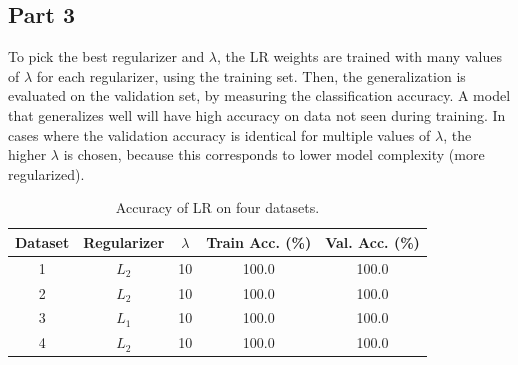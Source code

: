 \subsection{Part 3}
To pick the best regularizer and $\lambda$, the LR weights are trained with many values of $\lambda$ for each regularizer, using the training set.
Then, the generalization is evaluated on the validation set, by measuring the classification accuracy.
A model that generalizes well will have high accuracy on data not seen during training.
In cases where the validation accuracy is identical for multiple values of $\lambda$, the higher $\lambda$ is chosen, because this corresponds to lower model complexity (more regularized).

\begin{table}[ht!]
\centering
\begin{tabular}{||c c c c c||}  
 \hline
 Dataset & Regularizer & $\lambda$ & Train Acc. (\%) & Val. Acc. (\%) \\ [0.3ex] 
 \hline\hline
 1 & $L_2$ & 10 & 100.0 & 100.0 \\ 
 \hline
 2 & $L_2$ & 10 & 100.0 & 100.0 \\ 
 \hline
 3 & $L_1$ & 10 & 100.0 & 100.0 \\ 
 \hline
 4 & $L_2$ & 10 & 100.0 & 100.0 \\ 
 \hline
\end{tabular}
\caption{Accuracy of LR on four datasets.}
\label{table_lr_1_3}
\end{table}


